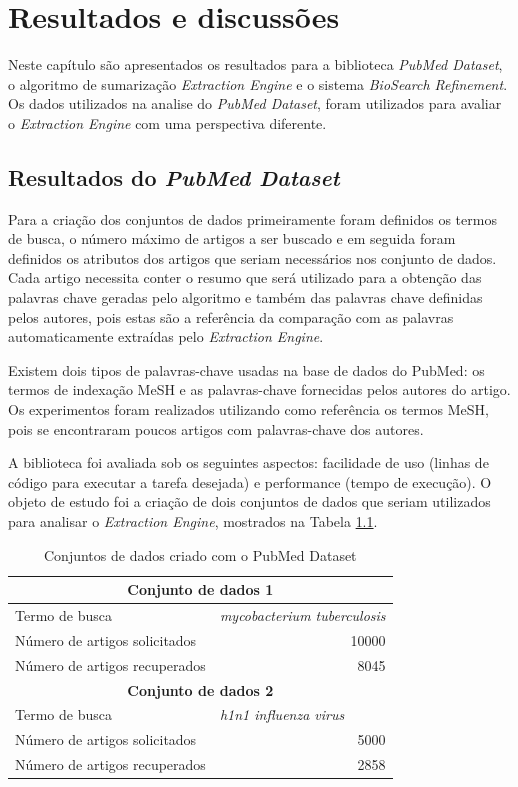\chapter{Resultados e discussões}

Neste capítulo são apresentados os resultados para a biblioteca \emph{PubMed Dataset}, o algoritmo de sumarização \emph{Extraction Engine} e o sistema \emph{BioSearch Refinement}. Os dados utilizados na analise do \emph{PubMed Dataset}, foram utilizados para avaliar o \emph{Extraction Engine} com uma perspectiva diferente.

\section{Resultados do \emph{PubMed Dataset}}
Para a criação dos conjuntos de dados primeiramente foram definidos os termos de busca, o
número máximo de artigos a ser buscado e em seguida foram definidos os atributos dos artigos
que seriam necessários nos conjunto de dados. Cada artigo necessita conter o resumo que será
utilizado para a obtenção das palavras chave geradas pelo algoritmo e também das palavras
chave definidas pelos autores, pois estas são a referência da comparação com as palavras
automaticamente extraídas pelo \emph{Extraction Engine}.

Existem dois tipos de palavras-chave usadas na base de dados do PubMed: os termos de
indexação MeSH e as palavras-chave fornecidas pelos autores do artigo. Os experimentos foram
realizados utilizando como referência os termos MeSH, pois se encontraram poucos artigos com
palavras-chave dos autores.

A biblioteca foi avaliada sob os seguintes aspectos: facilidade de uso (linhas de código para executar a tarefa desejada) e performance (tempo de execução). O objeto de estudo foi a criação de dois conjuntos de dados que seriam utilizados para analisar o \emph{Extraction Engine}, mostrados na Tabela \ref{tab:datasets}.


\begin{table}[htbp]
\center
\begin{tabular}{|l|l|}
\hline
\multicolumn{ 2}{|c|}{\textbf{Conjunto de dados 1}} \\ \hline
Termo de busca & \textit{mycobacterium tuberculosis} \\ \hline
Número de artigos solicitados & \multicolumn{1}{r|}{10000} \\ \hline
Número de artigos recuperados & \multicolumn{1}{r|}{8045} \\ \hline
\multicolumn{ 2}{|c|}{\textbf{Conjunto de dados 2}} \\ \hline
Termo de busca & \textit{h1n1 influenza virus} \\ \hline
Número de artigos solicitados & \multicolumn{1}{r|}{5000} \\ \hline
Número de artigos recuperados & \multicolumn{1}{r|}{2858} \\ \hline
\end{tabular}
\caption{Conjuntos de dados criado com o PubMed Dataset}
\label{tab:datasets}
\end{table}

